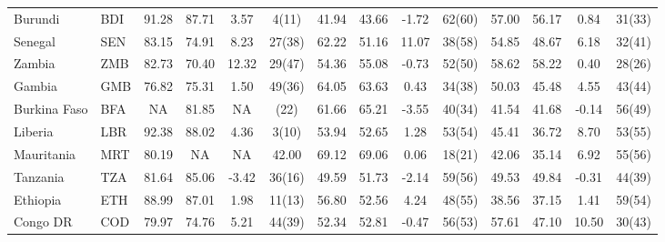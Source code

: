 \begin{longtable}{m{2.4cm}lcccc|cccc|cccc}
Burundi                           & BDI           & 91.28            & 87.71              & 3.57             & 4(11)            & 41.94    & 43.66      & -1.72    & 62(60)   & 57.00           & 56.17             & 0.84            & 31(33)          \\
Senegal                           & SEN           & 83.15            & 74.91              & 8.23             & 27(38)           & 62.22    & 51.16      & 11.07    & 38(58)   & 54.85           & 48.67             & 6.18            & 32(41)          \\
Zambia                            & ZMB           & 82.73            & 70.40              & 12.32            & 29(47)           & 54.36    & 55.08      & -0.73    & 52(50)   & 58.62           & 58.22             & 0.40            & 28(26)          \\
Gambia                            & GMB           & 76.82            & 75.31              & 1.50             & 49(36)           & 64.05    & 63.63      & 0.43     & 34(38)   & 50.03           & 45.48             & 4.55            & 43(44)          \\
Burkina Faso                      & BFA           & NA               & 81.85              & NA               & (22)             & 61.66    & 65.21      & -3.55    & 40(34)   & 41.54           & 41.68             & -0.14           & 56(49)          \\
Liberia                           & LBR           & 92.38            & 88.02              & 4.36             & 3(10)            & 53.94    & 52.65      & 1.28     & 53(54)   & 45.41           & 36.72             & 8.70            & 53(55)          \\
Mauritania                        & MRT           & 80.19            & NA                 & NA               & 42.00            & 69.12    & 69.06      & 0.06     & 18(21)   & 42.06           & 35.14             & 6.92            & 55(56)          \\
Tanzania      & TZA           & 81.64            & 85.06              & -3.42            & 36(16)           & 49.59    & 51.73      & -2.14    & 59(56)   & 49.53           & 49.84             & -0.31           & 44(39)          \\
Ethiopia                          & ETH           & 88.99            & 87.01              & 1.98             & 11(13)           & 56.80    & 52.56      & 4.24     & 48(55)   & 38.56           & 37.15             & 1.41            & 59(54)          \\
Congo DR & COD           & 79.97            & 74.76              & 5.21             & 44(39)           & 52.34    & 52.81      & -0.47    & 56(53)   & 57.61           & 47.10             & 10.50           & 30(43)          \\

\end{longtable}
